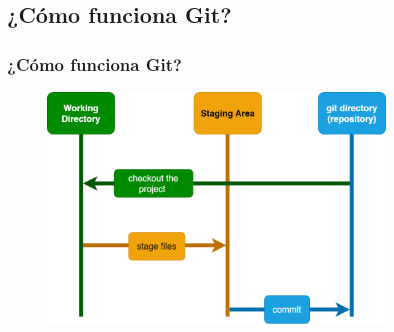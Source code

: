 \documentclass{beamer}
\begin{document}
\subsection{¿Cómo funciona Git?} 

\begin{frame}
  \frametitle{¿Cómo funciona Git?} 

  \begin{figure}
    \includegraphics[width = 0.8\textwidth]{images/git-states.png}
  \end{figure}
  
\end{frame}
\end{document}
